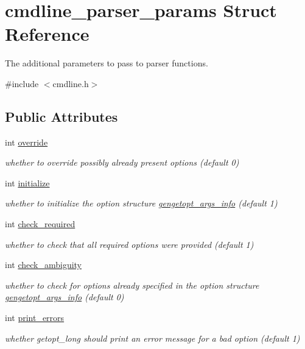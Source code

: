 \hypertarget{structcmdline__parser__params}{\section{cmdline\+\_\+parser\+\_\+params Struct Reference}
\label{structcmdline__parser__params}
}


The additional parameters to pass to parser functions.  




{\ttfamily \#include $<$cmdline.\+h$>$}

\subsection*{Public Attributes}
\begin{DoxyCompactItemize}
\item 
int \hyperlink{structcmdline__parser__params_ad3ff9d69146e69a47506782197b5675c}{override}
\begin{DoxyCompactList}\small\item\em whether to override possibly already present options (default 0) \end{DoxyCompactList}\item 
int \hyperlink{structcmdline__parser__params_a97ed8a6eabd39291ae7d73f273e12c11}{initialize}
\begin{DoxyCompactList}\small\item\em whether to initialize the option structure \hyperlink{structgengetopt__args__info}{gengetopt\+\_\+args\+\_\+info} (default 1) \end{DoxyCompactList}\item 
int \hyperlink{structcmdline__parser__params_a44ff439d7e9e36799e59173af74829c6}{check\+\_\+required}
\begin{DoxyCompactList}\small\item\em whether to check that all required options were provided (default 1) \end{DoxyCompactList}\item 
int \hyperlink{structcmdline__parser__params_a6e4442704fc40b0b655f7cc602f13ec4}{check\+\_\+ambiguity}
\begin{DoxyCompactList}\small\item\em whether to check for options already specified in the option structure \hyperlink{structgengetopt__args__info}{gengetopt\+\_\+args\+\_\+info} (default 0) \end{DoxyCompactList}\item 
int \hyperlink{structcmdline__parser__params_a3236f066777488e8502abe05ccd24455}{print\+\_\+errors}
\begin{DoxyCompactList}\small\item\em whether getopt\+\_\+long should print an error message for a bad option (default 1) \end{DoxyCompactList}\end{DoxyCompactItemize}


